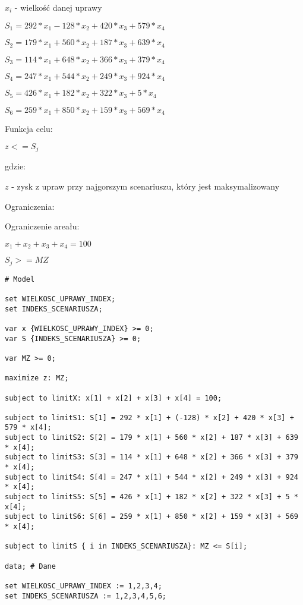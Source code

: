 \documentclass{article}
\begin{document}
$x_i$ - wielkość danej uprawy

$S_1 = 292 * x_1 - 128 * x_2 + 420 * x_3 + 579 * x_4$

$S_2 = 179 * x_1 + 560 * x_2 + 187 * x_3 + 639 * x_4$

$S_3 = 114 * x_1 + 648 * x_2 + 366 * x_3 + 379 * x_4$

$S_4 = 247 * x_1 + 544 * x_2 + 249 * x_3 + 924 * x_4$

$S_5 = 426 * x_1 + 182 * x_2 + 322 * x_3 + 5 * x_4$

$S_6 = 259 * x_1 + 850 * x_2 + 159 * x_3 + 569 * x_4$


\noindent
Funkcja celu:

$z <= S_j$ 

gdzie:

$z$ - zysk z upraw przy najgorszym scenariuszu, który jest maksymalizowany

\noindent
Ograniczenia:

\noindent
Ograniczenie areału:

$x_1 + x_2 + x_3 + x_4 = 100$

$S_j >= MZ$

\lstset{language=AMPL}
\begin{lstlisting}[caption={Model napisany w języku AMPL},label=DescriptiveLabel]
# Model

set WIELKOSC_UPRAWY_INDEX;
set INDEKS_SCENARIUSZA;

var x {WIELKOSC_UPRAWY_INDEX} >= 0;
var S {INDEKS_SCENARIUSZA} >= 0;

var MZ >= 0;

maximize z: MZ;

subject to limitX: x[1] + x[2] + x[3] + x[4] = 100;

subject to limitS1: S[1] = 292 * x[1] + (-128) * x[2] + 420 * x[3] + 579 * x[4];
subject to limitS2: S[2] = 179 * x[1] + 560 * x[2] + 187 * x[3] + 639 * x[4];
subject to limitS3: S[3] = 114 * x[1] + 648 * x[2] + 366 * x[3] + 379 * x[4];
subject to limitS4: S[4] = 247 * x[1] + 544 * x[2] + 249 * x[3] + 924 * x[4];
subject to limitS5: S[5] = 426 * x[1] + 182 * x[2] + 322 * x[3] + 5 * x[4];
subject to limitS6: S[6] = 259 * x[1] + 850 * x[2] + 159 * x[3] + 569 * x[4];

subject to limitS { i in INDEKS_SCENARIUSZA}: MZ <= S[i];

data; # Dane

set WIELKOSC_UPRAWY_INDEX := 1,2,3,4;
set INDEKS_SCENARIUSZA := 1,2,3,4,5,6;
\end{lstlisting}
\end{document}
